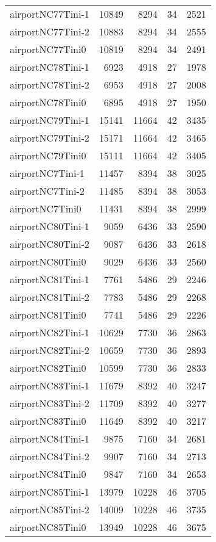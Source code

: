 \begin{longtable}{lrrrr}
airportNC77Tini-1 & 10849 & 8294 & 34 & 2521 \\
airportNC77Tini-2 & 10883 & 8294 & 34 & 2555 \\
airportNC77Tini0 & 10819 & 8294 & 34 & 2491 \\
airportNC78Tini-1 & 6923 & 4918 & 27 & 1978 \\
airportNC78Tini-2 & 6953 & 4918 & 27 & 2008 \\
airportNC78Tini0 & 6895 & 4918 & 27 & 1950 \\
airportNC79Tini-1 & 15141 & 11664 & 42 & 3435 \\
airportNC79Tini-2 & 15171 & 11664 & 42 & 3465 \\
airportNC79Tini0 & 15111 & 11664 & 42 & 3405 \\
airportNC7Tini-1 & 11457 & 8394 & 38 & 3025 \\
airportNC7Tini-2 & 11485 & 8394 & 38 & 3053 \\
airportNC7Tini0 & 11431 & 8394 & 38 & 2999 \\
airportNC80Tini-1 & 9059 & 6436 & 33 & 2590 \\
airportNC80Tini-2 & 9087 & 6436 & 33 & 2618 \\
airportNC80Tini0 & 9029 & 6436 & 33 & 2560 \\
airportNC81Tini-1 & 7761 & 5486 & 29 & 2246 \\
airportNC81Tini-2 & 7783 & 5486 & 29 & 2268 \\
airportNC81Tini0 & 7741 & 5486 & 29 & 2226 \\
airportNC82Tini-1 & 10629 & 7730 & 36 & 2863 \\
airportNC82Tini-2 & 10659 & 7730 & 36 & 2893 \\
airportNC82Tini0 & 10599 & 7730 & 36 & 2833 \\
airportNC83Tini-1 & 11679 & 8392 & 40 & 3247 \\
airportNC83Tini-2 & 11709 & 8392 & 40 & 3277 \\
airportNC83Tini0 & 11649 & 8392 & 40 & 3217 \\
airportNC84Tini-1 & 9875 & 7160 & 34 & 2681 \\
airportNC84Tini-2 & 9907 & 7160 & 34 & 2713 \\
airportNC84Tini0 & 9847 & 7160 & 34 & 2653 \\
airportNC85Tini-1 & 13979 & 10228 & 46 & 3705 \\
airportNC85Tini-2 & 14009 & 10228 & 46 & 3735 \\
airportNC85Tini0 & 13949 & 10228 & 46 & 3675 \\

\end{longtable}
